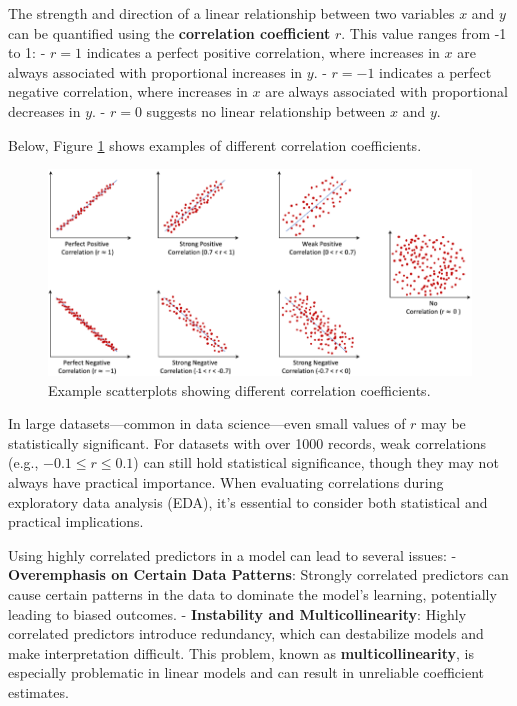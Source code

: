 \documentclass[
]{book}
\theoremstyle{definition}
\theoremstyle{definition}
\theoremstyle{definition}
\theoremstyle{definition}
\theoremstyle{remark}
\begin{document}
The strength and direction of a linear relationship between two variables \(x\) and \(y\) can be quantified using the \textbf{correlation coefficient} \(r\). This value ranges from -1 to 1:
- \textbf{\(r = 1\)} indicates a perfect positive correlation, where increases in \(x\) are always associated with proportional increases in \(y\).
- \textbf{\(r = -1\)} indicates a perfect negative correlation, where increases in \(x\) are always associated with proportional decreases in \(y\).
- \textbf{\(r = 0\)} suggests no linear relationship between \(x\) and \(y\).

Below, Figure \ref{fig:correlation} shows examples of different correlation coefficients.

\begin{figure}

{\centering \includegraphics[width=1\linewidth]{images/correlation} 

}

\caption{Example scatterplots showing different correlation coefficients.}\label{fig:correlation}
\end{figure}

In large datasets---common in data science---even small values of \(r\) may be statistically significant. For datasets with over 1000 records, weak correlations (e.g., \(-0.1 \leq r \leq 0.1\)) can still hold statistical significance, though they may not always have practical importance. When evaluating correlations during exploratory data analysis (EDA), it's essential to consider both statistical and practical implications.

Using highly correlated predictors in a model can lead to several issues:
- \textbf{Overemphasis on Certain Data Patterns}: Strongly correlated predictors can cause certain patterns in the data to dominate the model's learning, potentially leading to biased outcomes.
- \textbf{Instability and Multicollinearity}: Highly correlated predictors introduce redundancy, which can destabilize models and make interpretation difficult. This problem, known as \textbf{multicollinearity}, is especially problematic in linear models and can result in unreliable coefficient estimates.
\end{document}
